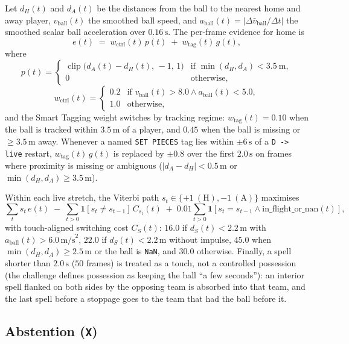 \documentclass[11pt,a4paper]{article}
\newcommand{\code}[1]{\texttt{#1}}
\begin{document}
Let $d_H(t)$ and $d_A(t)$ be the distances from the ball to the nearest home and away player,
$v_{\text{ball}}(t)$ the smoothed ball speed, and $a_{\text{ball}}(t) = |\Delta \bar{v}_{\text{ball}} / \Delta t|$
the smoothed scalar ball acceleration over $0.16\,\text{s}$. The per-frame evidence for home is
\[
  e(t) \;=\; w_{\text{ctrl}}(t)\,p(t) \;+\; w_{\text{tag}}(t)\,g(t),
\]
where
\[
  p(t) =
  \begin{cases}
    \operatorname{clip}\bigl(d_A(t) - d_H(t),\,-1,\,1\bigr) & \text{if } \min(d_H, d_A) < 3.5\ \text{m},\\
    0 & \text{otherwise,}
  \end{cases}
\]
\[
  w_{\text{ctrl}}(t) =
  \begin{cases}
    0.2 & \text{if } v_{\text{ball}}(t) > 8.0 \land a_{\text{ball}}(t) < 5.0,\\
    1.0 & \text{otherwise,}
  \end{cases}
\]
and the Smart Tagging weight switches by tracking regime: $w_{\text{tag}}(t) = 0.10$ when the
ball is tracked within $3.5\,\text{m}$ of a player, and $0.45$ when the ball is missing or
$\ge 3.5\,\text{m}$ away. Whenever a named \code{SET PIECES} tag lies within $\pm 6\,\text{s}$ of
a \code{D -> live} restart, $w_{\text{tag}}(t)\,g(t)$ is replaced by $\pm 0.8$ over the first
$2.0\,\text{s}$ on frames where proximity is missing or ambiguous ($|d_A - d_H| < 0.5\,\text{m}$
or $\min(d_H, d_A) \ge 3.5\,\text{m}$).

Within each live stretch, the Viterbi path $s_t \in \{+1\ (\text{H}), -1\ (\text{A})\}$ maximises
\[
  \sum_t s_t\,e(t) \;-\; \sum_{t > 0} \mathbf{1}[s_t \neq s_{t-1}]\,C_{s_t}(t)
  \;+\; 0.01 \sum_{t > 0} \mathbf{1}[s_t = s_{t-1} \land \text{in\_flight\_or\_nan}(t)],
\]
with touch-aligned switching cost $C_S(t)$: $16.0$ if $d_S(t) < 2.2\,\text{m}$ with
$a_{\text{ball}}(t) > 6.0\,\text{m/s}^2$, $22.0$ if $d_S(t) < 2.2\,\text{m}$ without impulse,
$45.0$ when $\min(d_H, d_A) \ge 2.5\,\text{m}$ or the ball is \code{NaN}, and $30.0$ otherwise.
Finally, a spell shorter than $2.0\,\text{s}$ ($50$ frames) is treated as a touch, not a
controlled possession (the challenge defines possession as keeping the ball ``a few seconds''): an
interior spell flanked on both sides by the opposing team is absorbed into that team, and the last
spell before a stoppage goes to the team that had the ball before it.

\subsection{Abstention (\code{X})}
\end{document}
